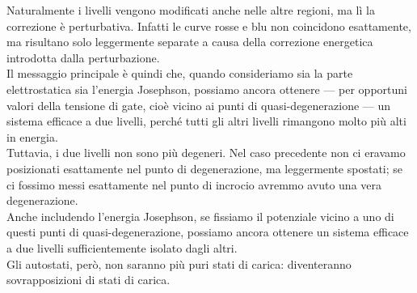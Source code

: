 Naturalmente i livelli vengono modificati anche nelle altre regioni, ma lì la correzione è perturbativa. Infatti le curve rosse e blu non coincidono esattamente, ma risultano solo leggermente separate a causa della correzione energetica introdotta dalla perturbazione.\\
Il messaggio principale è quindi che, quando consideriamo sia la parte elettrostatica sia l'energia Josephson, possiamo ancora ottenere — per opportuni valori della tensione di gate, cioè vicino ai punti di quasi-degenerazione — un sistema efficace a due livelli, perché tutti gli altri livelli rimangono molto più alti in energia.\\
Tuttavia, i due livelli non sono più degeneri. Nel caso precedente non ci eravamo posizionati esattamente nel punto di degenerazione, ma leggermente spostati; se ci fossimo messi esattamente nel punto di incrocio avremmo avuto una vera degenerazione.\\
Anche includendo l'energia Josephson, se fissiamo il potenziale vicino a uno di questi punti di quasi-degenerazione, possiamo ancora ottenere un sistema efficace a due livelli sufficientemente isolato dagli altri.\\
Gli autostati, però, non saranno più puri stati di carica: diventeranno sovrapposizioni di stati di carica.
